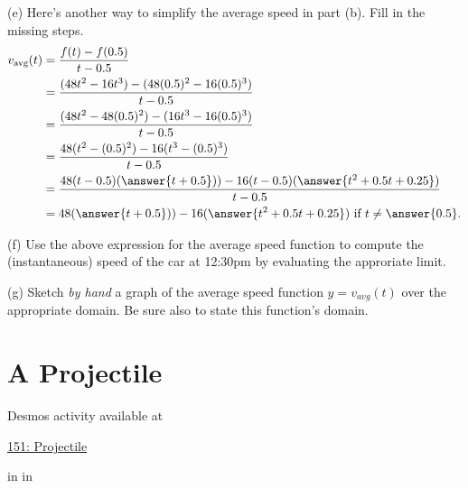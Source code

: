 \documentclass{ximera}
\newcommand{\pskip}{\vskip 0.1 in}
\begin{document}
\begin{example}
(e) Here's another way to simplify the average speed in part (b). Fill in the missing steps.
\begin{align*}
   v_{\text{avg}}(t) &= \frac{f(t) - f(0.5)}{t - 0.5} \\
                        &= \frac{(48t^2 - 16t^3) - (48(0.5)^2 -16(0.5)^3)}{t-0.5} \\
                        &= \frac{(48t^2 - 48(0.5)^2) - (16t^3 -16(0.5)^3) }{t-0.5} \\
                        &= \frac{48(t^2 - (0.5)^2) - 16(t^3 -(0.5)^3) }{t-0.5} \\
                       &= \frac{48(t-0.5)(\answer{t+0.5})) - 16(t-0.5)(\answer{t^2 + 0.5 t + 0.25}) }{t-0.5} \\
                       &=  48(\answer{t+0.5})) - 16(\answer{t^2 + 0.5 t + 0.25})  \text{ if } t\neq \answer{0.5}.
\end{align*}

(f) Use the above expression for the average speed function to compute the (instantaneous) speed of the car at 12:30pm by evaluating the approriate limit.

(g) Sketch \emph{by hand} a graph of the average speed function $y=v_{avg}(t)$ over the appropriate domain. Be sure also to state this function's domain. 


\end{example}


\section{A Projectile}

\begin{example}   \label{Ex4erxde}


 
\begin{onlineOnly}
    \begin{center}
\end{center}
\end{onlineOnly}

Desmos activity available at

\href{https://www.desmos.com/calculator/l4fknr0hpl}{151: Projectile}

\pskip \pskip


\end{example}
\end{document}
